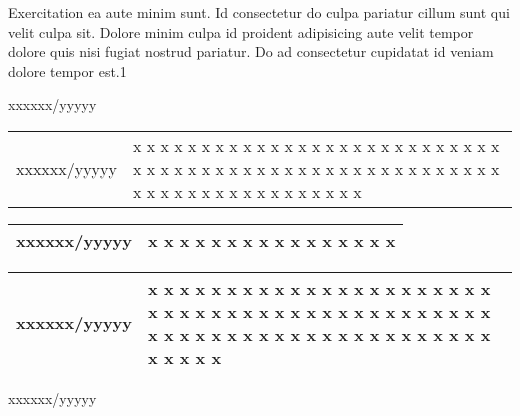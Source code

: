 
Exercitation ea aute minim sunt. {\mktsStyleItalic{}Id consectetur do culpa pariatur cillum sunt
qui velit culpa sit\/}. Dolore minim culpa id proident adipisicing aute velit
tempor dolore quis nisi fugiat nostrud pariatur. Do ad consectetur cupidatat id
veniam dolore tempor est.{\mktsEnStyleMarkMain{}1}



xxxxxx/yyyyy{%



\begin{tabular}{ | p{30mm} | p{129mm} | }
\hline
{{}xxxxxx/yyyyy} & x x x x x x x x x x x x x x x x x x x x x x x x x x x x x x x x x x x x x x x x x x x x x x x x x x x x x x x x x x x x x x x x x x x x x x x \\
\end{tabular}


\begin{tabular}{ | p{30mm} | p{129mm} | }
\hline
{{}xxxxxx/yyyyy} & x x x x x x x x x x x x x x x x \\
\hline
\end{tabular}


\begin{tabular}{ | p{30mm} | p{129mm} | }
{{}xxxxxx/yyyyy} & x x x x x x x x x x x x x x x x x x x x x x x x x x x x x x x x x x x x x x x x x x x x x x x x x x x x x x x x x x x x x x x x x x x x x x x \\
\hline
\end{tabular}
}


xxxxxx/yyyyy



